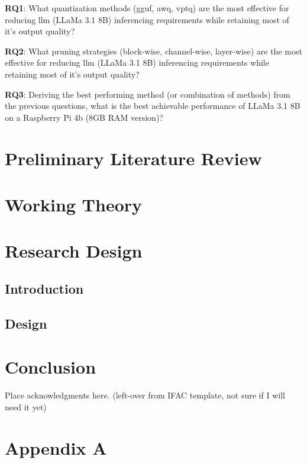 \documentclass{ifacconf}
\begin{document}
	\textbf{RQ1}: What quantization methods (\gls{gguf}, \gls{awq}, \gls{vptq}) are the most effective for reducing \gls{llm} (LLaMa 3.1 8B) inferencing requirements while retaining most of it's output quality?
	
	\textbf{RQ2}: What pruning strategies (block-wise, channel-wise, layer-wise) are the most effective for reducing \gls{llm} (LLaMa 3.1 8B) inferencing requirements while retaining most of it's output quality?
	
	\textbf{RQ3}: Deriving the best performing method (or combination of methods) from the previous questions, what is the best achievable performance of LLaMa 3.1 8B on a Raspberry Pi 4b (8GB RAM version)?
	
	
	\section{Preliminary Literature Review}
	
	\section{Working Theory}
	
	\section{Research Design}
	\subsection{Introduction}
	\subsection{Design}
	
	\section{Conclusion}
	
	
	\begin{ack}
		Place acknowledgments here. (left-over from IFAC template, not sure if I will need it yet)
	\end{ack}
	
	
	
	\printglossary[title={Abbreviations}]
	
	\appendix
	\section{Appendix A}
\end{document}
